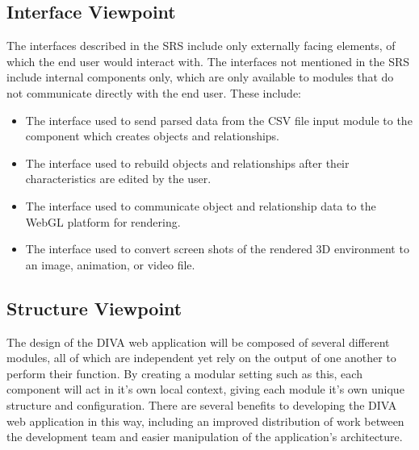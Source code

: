 \documentclass[journal,10pt,onecolumn,compsoc]{IEEEtran} \usepackage[margin=1.0in]{geometry} \usepackage{pdfpages}
\begin{document}
            
    
    \subsection{Interface Viewpoint}
        The interfaces described in the SRS include only externally facing elements, of which the end user would interact with. The interfaces not mentioned in the SRS include internal components only, which are only available to modules that do not communicate directly with the end user. These include:
        \begin{itemize}
            \item The interface used to send parsed data from the CSV file input module to the component which creates objects and relationships.
            \item The interface used to rebuild objects and relationships after their characteristics are edited by the user.
            \item The interface used to communicate object and relationship data to the WebGL platform for rendering.
            \item The interface used to convert screen shots of the rendered 3D environment to an image, animation, or video file.
        \end{itemize}
        
    \subsection{Structure Viewpoint}
        The design of the DIVA web application will be composed of several different modules, all of which are independent yet rely on the output of one another to perform their function. By creating a modular setting such as this, each component will act in it's own local context, giving each module it's own unique structure and configuration. There are several benefits to developing the DIVA web application in this way, including an improved distribution of work between the development team and easier manipulation of the application's architecture.
        
\end{document}

